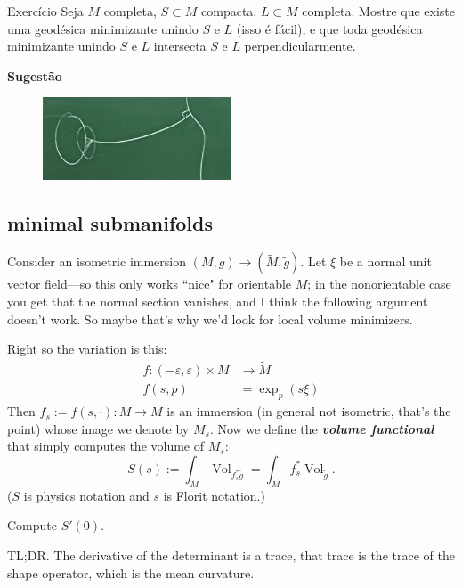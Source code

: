 \begin{thing6}{Exercício}\label{exer:}\leavevmode
Seja \(M\) completa, \(S \subset M\) compacta, \(L \subset M\) completa. Mostre que existe uma geodésica minimizante unindo \(S\) e \(L\) (isso é fácil), e que toda geodésica minimizante unindo \(S\) e \(L\) intersecta \(S\) e \(L\) perpendicularmente.

\textbf{Sugestão}
\begin{figure}[H]
	\centering
	\includegraphics[width=0.5\textwidth]{fig5}
	\caption*{}
\end{figure}
\end{thing6}

\subsection{minimal submanifolds}

Consider an isometric immersion \((M,g) \to(\tilde{M},\tilde{g})\). Let  \(\xi\) be a normal unit vector field---so this only works ``nice" for orientable \(M\); in the nonorientable case you get that the normal section vanishes, and I think the following argument doesn't work. So maybe that's why we'd look for local volume minimizers.

Right so the variation is this:
\begin{align*}
	f: (-\varepsilon,\varepsilon)\times M &\longrightarrow \tilde{M} \\
	f(s,p) &=\operatorname{exp}_{p}(s \xi)
\end{align*}
Then \(f_s:=f(s,\cdot):M \longrightarrow \tilde{M}\) is an immersion (in general not isometric, that's the point) whose image we denote by \(M_s\). Now we define the \textit{\textbf{volume functional}} that simply computes the volume of \(M_s\):
\[S(s):= \int_{M}\operatorname{Vol}_{f_s ^*\tilde{g}}=\int_M f_s^*\operatorname{Vol}_{\tilde{g}}.\]
(\(S\) is physics notation and \(s\) is Florit notation.)

\begin{exercise}\leavevmode
Compute \(S'(0)\).
\end{exercise}
TL;DR. The derivative of the determinant is a trace, that trace is the trace of the shape operator, which is the mean curvature.

